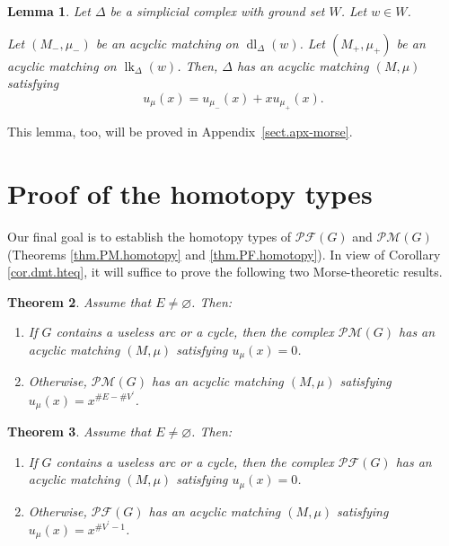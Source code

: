 \documentclass[12pt]{amsart}
\newtheorem{theorem}{Theorem}[section]
\newtheorem{lemma}[theorem]{Lemma}
\theoremstyle{definition}
\DeclareMathOperator{\lk}{lk}
\DeclareMathOperator{\dl}{dl}
\newcommand{\Pm}[1]{\mathcal{PM}\left(#1\right)}
\newcommand{\Pf}[1]{\mathcal{PF}\left(#1\right)}
\newcommand{\NS}{V^{\prime}}
\begin{document}
\begin{lemma}
\label{lem.dmt.rec}
Let $\Delta$ be a simplicial complex with ground set $W$.
Let $w\in W$.

Let $\left(  M_-,\mu_-\right)  $ be an acyclic matching on
$\dl_{\Delta}\left(  w\right)  $. Let $\left(
M_+,\mu_+\right)  $ be an acyclic matching on
$\lk_{\Delta}\left(  w\right)  $. Then, $\Delta$ has an acyclic matching
$\left(  M,\mu\right)  $ satisfying%
\[
u_{\mu}\left(  x\right)  =u_{\mu_-}\left(  x\right)  +xu_{\mu_+}\left(
x\right)  .
\]

\end{lemma}

This lemma, too, will be proved in Appendix~\ref{sect.apx-morse}.


\section{\label{sect.homtype-proof}Proof of the homotopy types}

Our final goal is to establish the homotopy types of $\Pf{G}$ and
$\Pm{G}$ (Theorems \ref{thm.PM.homotopy} and \ref{thm.PF.homotopy}).
In view of Corollary \ref{cor.dmt.hteq}, it will suffice to prove the
following two Morse-theoretic results.

\begin{theorem}
\label{thm.PM.morse} Assume that $E\neq\varnothing$. Then:

\begin{enumerate}
\item[(a)] If $G$ contains a useless arc or a cycle, then the complex
$\Pm{G}$ has an acyclic matching $\left(  M,\mu\right)  $ satisfying
$u_{\mu}\left(  x\right)  =0$.

\item[(b)] Otherwise, $\Pm{G}$ has an acyclic matching $\left(
M,\mu\right)  $ satisfying $u_{\mu}\left(  x\right)  =x^{\#E-\#\NS}$.
\end{enumerate}
\end{theorem}

\begin{theorem}
\label{thm.PF.morse} Assume that $E\neq\varnothing$. Then:

\begin{enumerate}
\item[(a)] If $G$ contains a useless arc or a cycle, then the complex
$\Pf{G}$ has an acyclic matching $\left(  M,\mu\right)  $ satisfying
$u_{\mu}\left(  x\right)  =0$.

\item[(b)] Otherwise, $\Pf{G}$ has an acyclic matching $\left(
M,\mu\right)  $ satisfying $u_{\mu}\left(  x\right)  =x^{\#\NS -1}$.
\end{enumerate}
\end{theorem}
\end{document}
